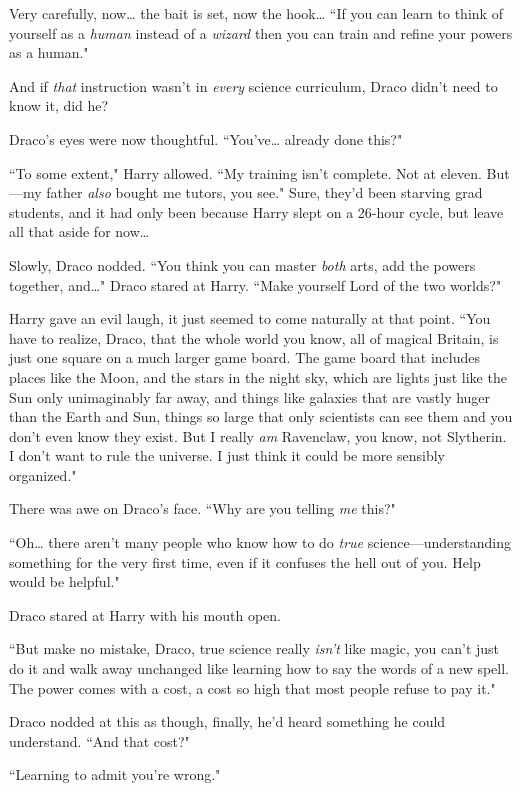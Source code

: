 Very carefully, now{\ldots} the bait is set, now the hook{\ldots} ``If you can learn to think of yourself as a \emph{human} instead of a \emph{wizard} then you can train and refine your powers as a human."

And if \emph{that} instruction wasn't in \emph{every} science curriculum, Draco didn't need to know it, did he?

Draco's eyes were now thoughtful. ``You've{\ldots} already done this?"

``To some extent," Harry allowed. ``My training isn't complete. Not at eleven. But—my father \emph{also} bought me tutors, you see." Sure, they'd been starving grad students, and it had only been because Harry slept on a 26-hour cycle, but leave all that aside for now{\ldots}

Slowly, Draco nodded. ``You think you can master \emph{both} arts, add the powers together, and{\ldots}" Draco stared at Harry. ``Make yourself Lord of the two worlds?"

Harry gave an evil laugh, it just seemed to come naturally at that point. ``You have to realize, Draco, that the whole world you know, all of magical Britain, is just one square on a much larger game board. The game board that includes places like the Moon, and the stars in the night sky, which are lights just like the Sun only unimaginably far away, and things like galaxies that are vastly huger than the Earth and Sun, things so large that only scientists can see them and you don't even know they exist. But I really \emph{am} Ravenclaw, you know, not Slytherin. I don't want to rule the universe. I just think it could be more sensibly organized."

There was awe on Draco's face. ``Why are you telling \emph{me} this?"

``Oh{\ldots} there aren't many people who know how to do \emph{true} science—understanding something for the very first time, even if it confuses the hell out of you. Help would be helpful."

Draco stared at Harry with his mouth open.

``But make no mistake, Draco, true science really \emph{isn't} like magic, you can't just do it and walk away unchanged like learning how to say the words of a new spell. The power comes with a cost, a cost so high that most people refuse to pay it."

Draco nodded at this as though, finally, he'd heard something he could understand. ``And that cost?"

``Learning to admit you're wrong."

